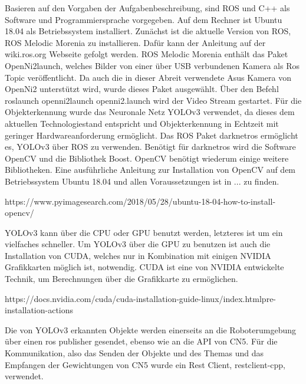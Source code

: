 Basieren auf den Vorgaben der Aufgabenbeschreibung, sind ROS und C++ als Software und Programmiersprache vorgegeben. Auf dem Rechner ist Ubuntu 18.04 als Betriebssystem installiert. Zunächst ist die aktuelle Version von ROS, ROS Melodic Morenia zu installieren. Dafür kann der Anleitung auf der wiki.ros.org Webseite gefolgt werden. 
ROS Melodic Morenia enthält das Paket OpenNi2launch, welches Bilder von einer über USB verbundenen Kamera als Ros Topic veröffentlicht. Da auch die in dieser Abreit verwendete Asus Kamera von OpenNi2 unterstützt wird, wurde dieses Paket ausgewählt. Über den Befehl roslaunch openni2launch openni2.launch wird der Video Stream gestartet.
Für die Objekterkennung wurde das Neuronale Netz YOLOv3 verwendet, da dieses dem aktuellen Technologiestand entspricht und Objekterkennung in Echtzeit mit geringer Hardwareanforderung ermöglicht. Das ROS Paket darknetros ermöglicht es, YOLOv3 über ROS zu verwenden. Benötigt für darknetros wird die Software OpenCV und die Bibliothek Boost. OpenCV benötigt wiederum einige weitere Bibliotheken. Eine ausführliche Anleitung zur Installation von OpenCV auf dem Betriebssystem Ubuntu 18.04 und allen Voraussetzungen ist in ... zu finden.

https://www.pyimagesearch.com/2018/05/28/ubuntu-18-04-how-to-install-opencv/

YOLOv3 kann über die CPU oder GPU benutzt werden, letzteres ist um ein vielfaches schneller. Um YOLOv3 über die GPU zu benutzen ist auch die Installation von CUDA, welches nur in Kombination mit einigen NVIDIA Grafikkarten möglich ist, notwendig. CUDA ist eine von NVIDIA entwickelte Technik, um Berechnungen über die Grafikkarte zu ermöglichen. 

https://docs.nvidia.com/cuda/cuda-installation-guide-linux/index.htmlpre-installation-actions

Die von YOLOv3 erkannten Objekte werden einerseits an die Roboterumgebung über einen ros publisher gesendet, ebenso wie an die API von CN5. Für die Kommunikation, also das Senden der Objekte und des Themas und das Empfangen der Gewichtungen von CN5 wurde ein Rest Client, restclient-cpp, verwendet. 



